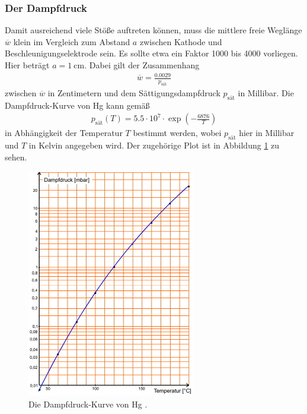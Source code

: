 \subsubsection{Der Dampfdruck}
\label{sec:dampfdruck}
Damit ausreichend viele Stöße auftreten können, muss die mittlere freie Weglänge $\overline{w}$ klein im Vergleich zum Abstand $a$ zwischen Kathode und Beschleunigungselektrode sein.
Es sollte etwa ein Faktor 1000 bis 4000 vorliegen.
Hier beträgt $a = \qty{1}{\cm}$.
Dabei gilt der Zusammenhang 
\begin{align}
    \overline{w} = \frac{0.0029}{p_\text{sät}}
    \label{eq:weglaenge}
\end{align} 
zwischen $\overline{w}$ in Zentimetern und dem Sättigungsdampfdruck $p_\text{sät}$ in Millibar.
Die Dampfdruck-Kurve von Hg kann gemäß 
\begin{align}
    p_\text{sät}(T) = \num{5.5} \cdot 10^7 \cdot \exp\left(-\frac{6876}{T}\right)
    \label{eq:dampfdruck}
\end{align}
in Abhängigkeit der Temperatur $T$ bestimmt werden, wobei $p_\text{sät}$ hier in Millibar und $T$ in Kelvin angegeben wird.
Der zugehörige Plot ist in Abbildung \ref{fig:dampfdruck} zu sehen.

\begin{figure}[H]
    \centering
    \includegraphics[height = 10cm]{bilder/dampfdruck.png}
    \caption{Die Dampfdruck-Kurve von Hg \cite{man:v601}.}
    \label{fig:dampfdruck}
\end{figure}

